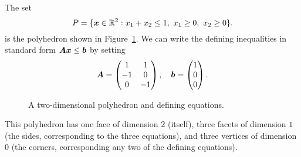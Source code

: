 \begin{example}\label{ex:trian}
 The set
 \begin{equation*}
  P=\{\bm{x}\in \mathbb{R}^2 \mathrel{\mathop{:}} x_1+x_2\leq 1, \ x_1\geq 0, \ x_2\geq 0\}.
 \end{equation*}
is the polyhedron shown in Figure~\ref{fig:triangle}. We can write the defining inequalities in standard form $\bm{A}\bm{x}\leq \bm{b}$ by setting 
\begin{equation*}
 \bm{A} = \begin{pmatrix}
            1 & 1\\
            -1 & 0\\
            0 & -1
           \end{pmatrix}, \quad
 \bm{b} = \begin{pmatrix}
            1 \\ 0 \\ 0
           \end{pmatrix}.
\end{equation*}
\begin{figure}[h!]
\centering
{}
\caption{A two-dimensional polyhedron and defining equations.}\label{fig:triangle}
\end{figure}
This polyhedron has one face of dimension $2$ (itself), three facets of dimension $1$ (the sides, corresponding to the three equations), and three vertices of dimension $0$ (the corners, corresponding any two of the defining equations).
\end{example}

